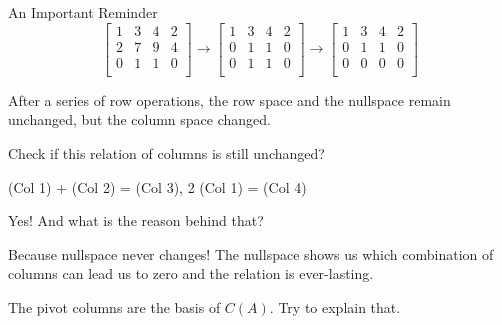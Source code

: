 \documentclass{beamer}
\begin{document}
\begin{frame}{An Important Reminder}
\begin{equation*}
    \left[ \begin{matrix}
        1&		3&		4&		2\\
        2&		7&		9&		4\\
        0&		1&		1&		0\\
    \end{matrix} \right] \rightarrow \left[ \begin{matrix}
        1&		3&		4&		2\\
        0&		1&		1&		0\\
        0&		1&		1&		0\\
    \end{matrix} \right] \rightarrow \left[ \begin{matrix}
        1&		3&		4&		2\\
        0&		1&		1&		0\\
        0&		0&		0&		0\\
    \end{matrix} \right]
\end{equation*}

After a series of row operations, the row space and the nullspace remain unchanged, but the column space changed.

\vspace{3pt}
Check if this relation of columns is still unchanged?
\begin{center}
    (Col 1) + (Col 2) = (Col 3), 2 (Col 1) = (Col 4)
\end{center}

Yes! And what is the reason behind that?

\vspace{3pt}
Because nullspace never changes! The nullspace shows us which combination of columns can lead us to zero and the relation is ever-lasting.

\vspace{3pt}
The pivot columns are the basis of $C(A)$. Try to explain that.


\end{frame}
\end{document}
